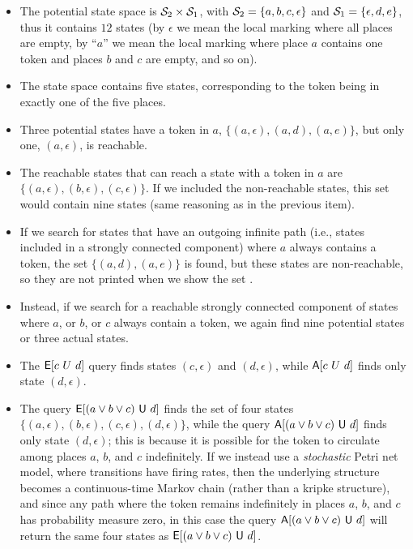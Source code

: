 \begin{itemize}
\item
The potential state space is $\mathcal{S}_2 \times \mathcal{S}_1$,
with $\mathcal{S}_2 = \{a, b, c, \epsilon\}$ and $\mathcal{S}_1 = \{\epsilon, d, e\}$,
thus it contains $12$ states
(by  $\epsilon$ we mean the local marking where all places are empty,
by ``$a$'' we mean the local marking where place $a$ contains one token
and places $b$ and $c$ are empty, and so on).
\item
The state space contains five states, corresponding to the token being in
exactly one of the five places.  
\item
Three potential states have a token in $a$,
$\{(a,\epsilon),(a,d),(a,e)\}$, but only one, $(a,\epsilon)$, is reachable.
\item
The reachable states that can reach a state with a token in $a$ are
$\{(a,\epsilon), (b,\epsilon), (c,\epsilon)\}$.
If we included the non-reachable states, this set would
contain nine states (same reasoning as in the previous item).
\item
If we search for states that have an outgoing infinite path (i.e., states
included in a strongly connected component) where $a$ always contains a token,
the set $\{(a,d), (a,e)\}$ is found, but these states are non-reachable,
so they are not printed when we show the set .

\item
Instead, if we search for a reachable strongly connected component of states
where $a$, or $b$, or $c$ always contain a token,
we again find nine potential states or three actual states.
\item
The $\mathsf{E}[c~U~d]$ query finds states $(c,\epsilon)$ and $(d,\epsilon)$,
while $\mathsf{A}[c~U~d]$ finds only state $(d,\epsilon)$.


\item
The query $\mathsf{E}[(a \vee b \vee c)~\mathsf{U}~d]$ 
finds the set of four states
$\{(a,\epsilon), (b,\epsilon), (c,\epsilon), (d,\epsilon)\}$,
while the query $\mathsf{A}[(a \vee b \vee c)~\mathsf{U}~d]$
finds only state $(d, \epsilon)$;
this is because it is possible for the token to circulate
among places $a$, $b$, and $c$ indefinitely.
If we instead use a \emph{stochastic} Petri net model,
where transitions have firing rates,
then the underlying structure becomes a continuous-time Markov chain
(rather than a kripke structure),
and since any path where the token remains indefinitely in places
$a$, $b$, and $c$ has probability measure zero,
in this case the query $\mathsf{A}[(a \vee b \vee c)~\mathsf{U}~d]$
will return the same four states as
$\mathsf{E}[(a \vee b \vee c)~\mathsf{U}~d]$.

\end{itemize}




